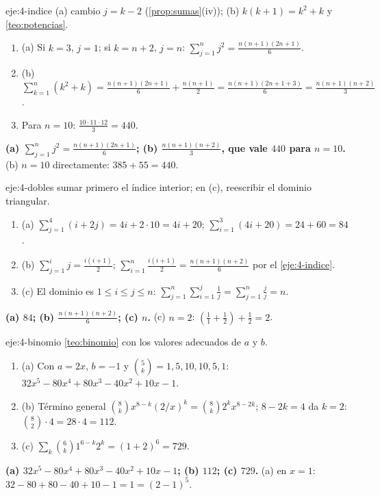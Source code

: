 \begin{solucion}{eje:4-indice}
\planteamiento (a) cambio $j=k-2$ (\cref{prop:sumas}(iv)); (b) $k(k+1)=k^2+k$ y \cref{teo:potencias}.
\pasos
\begin{enumerate}[label=\arabic*.]
  \item (a) Si $k=3$, $j=1$; si $k=n+2$, $j=n$: $\sum_{j=1}^nj^2=\frac{n(n+1)(2n+1)}6$.
  \item (b) $\sum_{k=1}^n(k^2+k)=\frac{n(n+1)(2n+1)}6+\frac{n(n+1)}2=\frac{n(n+1)(2n+1+3)}6=\frac{n(n+1)(n+2)}3$.
  \item Para $n=10$: $\frac{10\cdot11\cdot12}3=440$.
\end{enumerate}
\resultado \textbf{(a) $\sum_{j=1}^nj^2=\frac{n(n+1)(2n+1)}6$; (b) $\frac{n(n+1)(n+2)}3$, que vale $440$ para $n=10$.}
\comprobacion (b) $n=10$ directamente: $385+55=440$.
\end{solucion}

\begin{solucion}{eje:4-dobles}
\planteamiento sumar primero el índice interior; en (c), reescribir el dominio triangular.
\pasos
\begin{enumerate}[label=\arabic*.]
  \item (a) $\sum_{j=1}^4(i+2j)=4i+2\cdot10=4i+20$; $\sum_{i=1}^3(4i+20)=24+60=84$.
  \item (b) $\sum_{j=1}^ij=\frac{i(i+1)}2$; $\sum_{i=1}^n\frac{i(i+1)}2=\frac{n(n+1)(n+2)}6$ por el \cref{eje:4-indice}.
  \item (c) El dominio es $1\le i\le j\le n$: $\sum_{j=1}^n\sum_{i=1}^j\frac1j=\sum_{j=1}^n\frac jj=n$.
\end{enumerate}
\resultado \textbf{(a) $84$; (b) $\frac{n(n+1)(n+2)}6$; (c) $n$.}
\comprobacion (c) $n=2$: $(\frac11+\frac12)+\frac12=2$.
\end{solucion}

\begin{solucion}{eje:4-binomio}
\planteamiento \cref{teo:binomio} con los valores adecuados de $a$ y $b$.
\pasos
\begin{enumerate}[label=\arabic*.]
  \item (a) Con $a=2x$, $b=-1$ y $\binom5k=1,5,10,10,5,1$: $32x^5-80x^4+80x^3-40x^2+10x-1$.
  \item (b) Término general $\binom8kx^{8-k}(2/x)^k=\binom8k2^kx^{8-2k}$; $8-2k=4$ da $k=2$: $\binom82\cdot4=28\cdot4=112$.
  \item (c) $\sum_k\binom6k1^{6-k}2^k=(1+2)^6=729$.
\end{enumerate}
\resultado \textbf{(a) $32x^5-80x^4+80x^3-40x^2+10x-1$; (b) $112$; (c) $729$.}
\comprobacion (a) en $x=1$: $32-80+80-40+10-1=1=(2-1)^5$.
\end{solucion}

